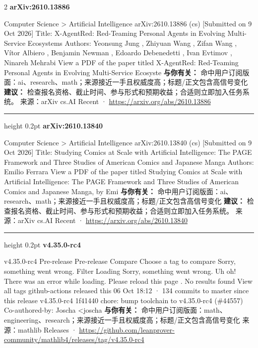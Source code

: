 \documentclass[10.5pt]{ctexart}
\begin{document}
\begin{multicols}{2}
{\large\bfseries arXiv:2610.13886}\par
Computer Science > Artificial Intelligence arXiv:2610.13886 (cs) [Submitted on 9 Oct 2026] Title: X-AgentRed: Red-Teaming Personal Agents in Evolving Multi-Service Ecosystems Authors: Yeonsung Jung , Zhiyuan Wang , Zifan Wang , Vítor Albiero , Benjamin Newman , Edoardo Debenedetti , Ivan Evtimov , Ninareh Mehrabi View a PDF of the paper titled X-AgentRed: Red-Teaming Personal Agents in Evolving Multi-Service Ecosyste
\textbf{与你有关：} 命中用户订阅版面：ai、research、math；来源接近一手且权威度高；标题/正文包含高信号变化
\textbf{建议：} 检查报名资格、截止时间、参与形式和预期收益；合适则立即加入任务系统。
{\footnotesize\color{ormuted} 来源：arXiv cs.AI Recent · \url{https://arxiv.org/abs/2610.13886}}
\vspace{2mm}
\hrule height 0.2pt
\vspace{2mm}
{\large\bfseries arXiv:2610.13840}\par
Computer Science > Artificial Intelligence arXiv:2610.13840 (cs) [Submitted on 9 Oct 2026] Title: Studying Comics at Scale with Artificial Intelligence: The PAGE Framework and Three Studies of American Comics and Japanese Manga Authors: Emilio Ferrara View a PDF of the paper titled Studying Comics at Scale with Artificial Intelligence: The PAGE Framework and Three Studies of American Comics and Japanese Manga, by Emi
\textbf{与你有关：} 命中用户订阅版面：ai、research、math；来源接近一手且权威度高；标题/正文包含高信号变化
\textbf{建议：} 检查报名资格、截止时间、参与形式和预期收益；合适则立即加入任务系统。
{\footnotesize\color{ormuted} 来源：arXiv cs.AI Recent · \url{https://arxiv.org/abs/2610.13840}}
\vspace{2mm}
\hrule height 0.2pt
\vspace{2mm}
{\large\bfseries v4.35.0-rc4}\par
v4.35.0-rc4 Pre-release Pre-release Compare Choose a tag to compare Sorry, something went wrong. Filter Loading Sorry, something went wrong. Uh oh! There was an error while loading. Please reload this page . No results found View all tags github-actions released this 06 Oct 18:12 · 134 commits to master since this release v4.35.0-rc4 1f41440 chore: bump toolchain to v4.35.0-rc4 (\#44557) Co-authored-by: Joscha <joscha
\textbf{与你有关：} 命中用户订阅版面：math、engineering、research；来源接近一手且权威度高；标题/正文包含高信号变化
{\footnotesize\color{ormuted} 来源：mathlib Releases · \url{https://github.com/leanprover-community/mathlib4/releases/tag/v4.35.0-rc4}}

\end{multicols}
\end{document}
